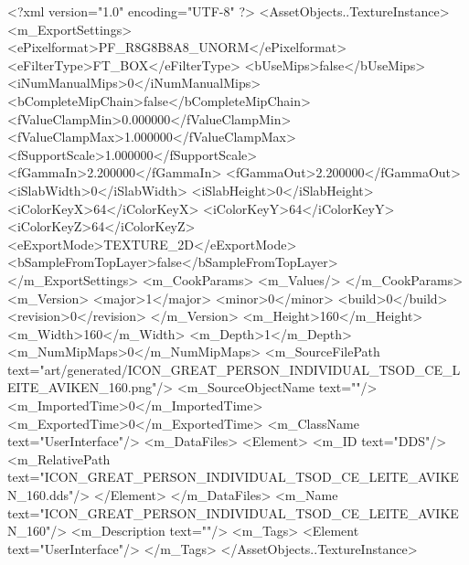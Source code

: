 <?xml version="1.0" encoding="UTF-8" ?>
<AssetObjects..TextureInstance>
	<m_ExportSettings>
		<ePixelformat>PF_R8G8B8A8_UNORM</ePixelformat>
		<eFilterType>FT_BOX</eFilterType>
		<bUseMips>false</bUseMips>
		<iNumManualMips>0</iNumManualMips>
		<bCompleteMipChain>false</bCompleteMipChain>
		<fValueClampMin>0.000000</fValueClampMin>
		<fValueClampMax>1.000000</fValueClampMax>
		<fSupportScale>1.000000</fSupportScale>
		<fGammaIn>2.200000</fGammaIn>
		<fGammaOut>2.200000</fGammaOut>
		<iSlabWidth>0</iSlabWidth>
		<iSlabHeight>0</iSlabHeight>
		<iColorKeyX>64</iColorKeyX>
		<iColorKeyY>64</iColorKeyY>
		<iColorKeyZ>64</iColorKeyZ>
		<eExportMode>TEXTURE_2D</eExportMode>
		<bSampleFromTopLayer>false</bSampleFromTopLayer>
	</m_ExportSettings>
	<m_CookParams>
		<m_Values/>
	</m_CookParams>
	<m_Version>
		<major>1</major>
		<minor>0</minor>
		<build>0</build>
		<revision>0</revision>
	</m_Version>
	<m_Height>160</m_Height>
	<m_Width>160</m_Width>
	<m_Depth>1</m_Depth>
	<m_NumMipMaps>0</m_NumMipMaps>
	<m_SourceFilePath text="art/generated/ICON_GREAT_PERSON_INDIVIDUAL_TSOD_CE_LEITE_AVIKEN_160.png"/>
	<m_SourceObjectName text=""/>
	<m_ImportedTime>0</m_ImportedTime>
	<m_ExportedTime>0</m_ExportedTime>
	<m_ClassName text="UserInterface"/>
	<m_DataFiles>
		<Element>
			<m_ID text="DDS"/>
			<m_RelativePath text="ICON_GREAT_PERSON_INDIVIDUAL_TSOD_CE_LEITE_AVIKEN_160.dds"/>
		</Element>
	</m_DataFiles>
	<m_Name text="ICON_GREAT_PERSON_INDIVIDUAL_TSOD_CE_LEITE_AVIKEN_160"/>
	<m_Description text=""/>
	<m_Tags>
		<Element text="UserInterface"/>
	</m_Tags>
</AssetObjects..TextureInstance>

